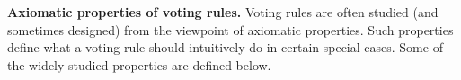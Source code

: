 \documentclass[prodmode,acmec]{ec-acmsmall}
\newcommand{\calL}{{\mathcal{L}}}
\newcommand{\rank}{{\calL(A)}}
\begin{document}

\noindent \textbf{Axiomatic properties of voting rules.} Voting rules are often studied (and sometimes designed) from the viewpoint of axiomatic properties. Such properties define what a voting rule should intuitively do in certain special cases. Some of the widely studied properties are defined below. 
\end{document}
